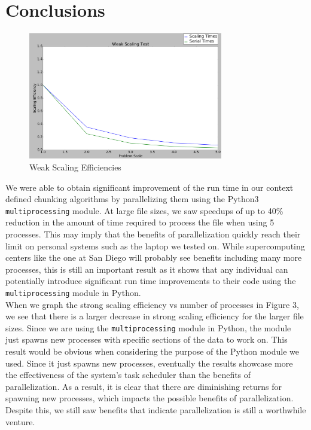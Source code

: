 \documentclass{acmtog} %
\begin{document}
	\section{Conclusions}
			\begin{figure}
				\centerline{\includegraphics[width=8.5cm]{img/WeakScaling}}
				\caption{Weak Scaling Efficiencies}
				\label{fig:weakscale}
			\end{figure}
	We were able to obtain significant improvement of the run time in our context defined chunking algorithms by parallelizing them using the Python3 \texttt{multiprocessing} module. At large file sizes, we saw speedups of up to 40\% reduction in the amount of time required to process the file when using 5 processes. This may imply that the benefits of parallelization quickly reach their limit on personal systems such as the laptop we tested on. While supercomputing centers like the one at San Diego will probably see benefits including many more processes, this is still an important result as it shows that any individual can potentially introduce significant run time improvements to their code using the \texttt{multiprocessing} module in Python. \\
	
	When we graph the strong scaling efficiency vs number of processes in Figure 3, we see that there is a larger decrease in strong scaling efficiency for the larger file sizes. Since we are using the \texttt{multiprocessing} module in Python, the module just spawns new processes with specific sections of the data to work on. This result would be obvious when considering the purpose of the Python module we used. Since it just spawns new processes, eventually the results showcase more the effectiveness of the system's task scheduler than the benefits of parallelization. As a result, it is clear that there are diminishing returns for spawning new processes, which impacts the possible benefits of parallelization. Despite this, we still saw benefits that indicate parallelization is still a worthwhile venture. \\
	
\end{document}
